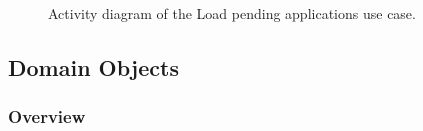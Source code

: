 \documentclass[12pt]{article}
\begin{document}
\begin{figure}[H]
\centering	
{}
\caption{Activity diagram of the Load pending applications use case.}
\end{figure}

\vspace{0.2in}

\subsection{Domain Objects}
\subsubsection{Overview}
\end{document}
